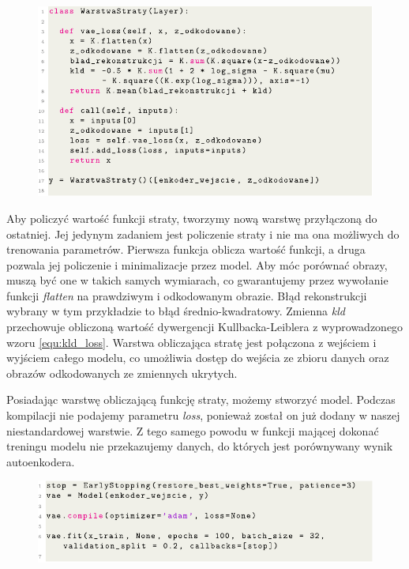 \documentclass[a4paper,12pt,oneside]{book} %
\begin{document}
\begin{figure}[h!]
	\centering
	\includegraphics[width=\linewidth]{vaeloss.pdf}
\end{figure}

\newpage
Aby policzyć wartość funkcji straty, tworzymy nową warstwę przyłączoną do ostatniej. Jej jedynym zadaniem jest policzenie straty i nie ma ona możliwych do trenowania parametrów. Pierwsza funkcja oblicza wartość funkcji, a druga pozwala jej policzenie i minimalizacje przez model. Aby móc porównać obrazy, muszą być one w takich samych wymiarach, co gwarantujemy przez wywołanie funkcji \textit{flatten} na prawdziwym i odkodowanym obrazie. Błąd rekonstrukcji wybrany w tym przykładzie to błąd średnio-kwadratowy. Zmienna \textit{kld} przechowuje obliczoną wartość dywergencji Kullbacka-Leiblera z wyprowadzonego wzoru \ref{equ:kld_loss}. Warstwa obliczająca stratę jest połączona z wejściem i wyjściem całego modelu, co umożliwia dostęp do wejścia ze zbioru danych oraz obrazów odkodowanych ze zmiennych ukrytych. 


Posiadając warstwę obliczającą funkcję straty, możemy stworzyć model. Podczas kompilacji nie podajemy parametru \textit{loss}, ponieważ został on już dodany w naszej niestandardowej warstwie. Z tego samego powodu w funkcji mającej dokonać treningu modelu nie przekazujemy danych, do których jest porównywany wynik autoenkodera.
\begin{figure}[h!]
	\centering
	\includegraphics[width=\linewidth]{vaetrain.pdf}
\end{figure}
\end{document}
